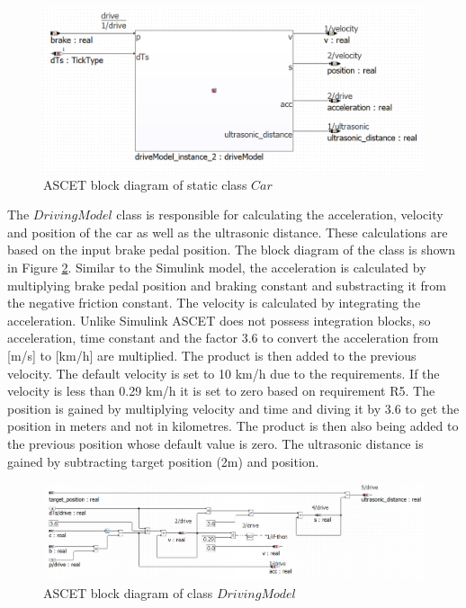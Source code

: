 \begin{figure}[H]
\centering
\includegraphics[width=1\textwidth]{images/Blockdiagramm_car.png}
\caption{ASCET block diagram of static class $Car$}
\label{fig:BlockdiagrammCar}
\end{figure}

The $DrivingModel$ class is responsible for calculating the acceleration, velocity and position of the car as well as the ultrasonic distance. These calculations are based on the input brake pedal position. The block diagram of the class is shown in Figure \ref{fig:BlockdiagrammDrivingModel}. Similar to the Simulink model, the acceleration is calculated by multiplying brake pedal position and braking constant and substracting it from the negative friction constant. The velocity is calculated by integrating the acceleration. Unlike Simulink ASCET does not possess integration blocks, so acceleration, time constant and the factor 3.6 to convert the acceleration from [m/s] to [km/h] are multiplied. The product is then added to the previous velocity. The default velocity is set to 10 km/h due to the requirements. If the velocity is less than 0.29 km/h it is set to zero based on requirement R5. The position is gained by multiplying velocity and time and diving it by 3.6 to get the position in meters and not in kilometres. The product is then also being added to the previous position whose default value is zero. The ultrasonic distance is gained by subtracting target position (2m) and position.

\begin{figure}[H]
\centering
\includegraphics[width=1\textwidth]{images/Blockdiagramm_drivingmodel.png}
\caption{ASCET block diagram of class $DrivingModel$}
\label{fig:BlockdiagrammDrivingModel}
\end{figure}

